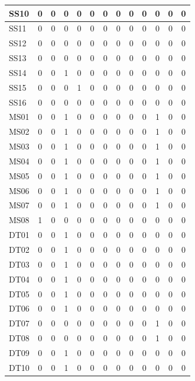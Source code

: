 \documentclass [10pt]{article}
\begin{document}
\begin{longtable}{ | p{} | c | c | c | c | c | c | c | c | c | c | c | c | }
	SS10 & 0 & 0 & 0 & 0 & 0 & 0 & 0 & 0 & 0 & 0 & 0 & 0 \\ \hline
	SS11 & 0 & 0 & 0 & 0 & 0 & 0 & 0 & 0 & 0 & 0 & 0 & 0 \\ \hline
	SS12 & 0 & 0 & 0 & 0 & 0 & 0 & 0 & 0 & 0 & 0 & 0 & 0 \\ \hline
	SS13 & 0 & 0 & 0 & 0 & 0 & 0 & 0 & 0 & 0 & 0 & 0 & 0 \\ \hline
	SS14 & 0 & 0 & 1 & 0 & 0 & 0 & 0 & 0 & 0 & 0 & 0 & 0 \\ \hline
	SS15 & 0 & 0 & 0 & 1 & 0 & 0 & 0 & 0 & 0 & 0 & 0 & 0 \\ \hline
	SS16 & 0 & 0 & 0 & 0 & 0 & 0 & 0 & 0 & 0 & 0 & 0 & 0 \\ \hline
	MS01 & 0 & 0 & 1 & 0 & 0 & 0 & 0 & 0 & 0 & 1 & 0 & 0 \\ \hline
	MS02 & 0 & 0 & 1 & 0 & 0 & 0 & 0 & 0 & 0 & 1 & 0 & 0 \\ \hline
	MS03 & 0 & 0 & 1 & 0 & 0 & 0 & 0 & 0 & 0 & 1 & 0 & 0 \\ \hline
	MS04 & 0 & 0 & 1 & 0 & 0 & 0 & 0 & 0 & 0 & 1 & 0 & 0 \\ \hline
	MS05 & 0 & 0 & 1 & 0 & 0 & 0 & 0 & 0 & 0 & 1 & 0 & 0 \\ \hline
	MS06 & 0 & 0 & 1 & 0 & 0 & 0 & 0 & 0 & 0 & 1 & 0 & 0 \\ \hline
	MS07 & 0 & 0 & 1 & 0 & 0 & 0 & 0 & 0 & 0 & 1 & 0 & 0 \\ \hline
	MS08 & 1 & 0 & 0 & 0 & 0 & 0 & 0 & 0 & 0 & 0 & 0 & 0 \\ \hline
	DT01 & 0 & 0 & 1 & 0 & 0 & 0 & 0 & 0 & 0 & 0 & 0 & 0 \\ \hline
	DT02 & 0 & 0 & 1 & 0 & 0 & 0 & 0 & 0 & 0 & 0 & 0 & 0 \\ \hline
	DT03 & 0 & 0 & 1 & 0 & 0 & 0 & 0 & 0 & 0 & 0 & 0 & 0 \\ \hline
	DT04 & 0 & 0 & 1 & 0 & 0 & 0 & 0 & 0 & 0 & 0 & 0 & 0 \\ \hline
	DT05 & 0 & 0 & 1 & 0 & 0 & 0 & 0 & 0 & 0 & 0 & 0 & 0 \\ \hline
	DT06 & 0 & 0 & 1 & 0 & 0 & 0 & 0 & 0 & 0 & 0 & 0 & 0 \\ \hline
	DT07 & 0 & 0 & 0 & 0 & 0 & 0 & 0 & 0 & 0 & 1 & 0 & 0 \\ \hline
	DT08 & 0 & 0 & 0 & 0 & 0 & 0 & 0 & 0 & 0 & 1 & 0 & 0 \\ \hline
	DT09 & 0 & 0 & 1 & 0 & 0 & 0 & 0 & 0 & 0 & 0 & 0 & 0 \\ \hline
	DT10 & 0 & 0 & 1 & 0 & 0 & 0 & 0 & 0 & 0 & 0 & 0 & 0 \\ \hline

\end{longtable}
\end{document}
